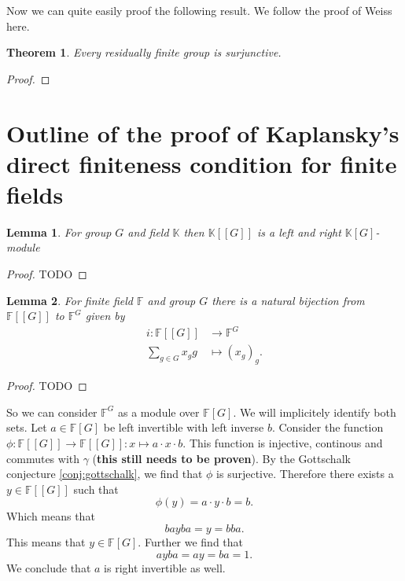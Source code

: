 \documentclass[titlepage, a4paper]{article}
\newcommand{\F}{\mathbb{F}}
\newtheorem{theorem}{Theorem}
\newtheorem{lemma}{Lemma}
\theoremstyle{remark}
\begin{document}
    Now we can quite easily proof the following result. We follow the proof of Weiss \cite{} here.
    \begin{theorem} \label{thm:res_fin_surjunctive}
    Every residually finite group is surjunctive.
    \end{theorem}
    \begin{proof}
    
    \end{proof}


	\section{Outline of the proof of Kaplansky's direct finiteness condition for finite fields}

	\begin{lemma}
		For group $G$ and field $\mathbb K$ then $\mathbb{K}[[G]]$ is a left and right $\mathbb{K}[G]$-module
	\end{lemma}
	\begin{proof}
		TODO
	\end{proof}
	\begin{lemma}
		For finite field $\F$ and group $G$ there is a natural bijection from $\F[[G]]$ to $\F^{G}$ given by \begin{align*}
			i: \F[[G]] &\longrightarrow \F^{G} \\
			\sum_{g \in G}^{ } x_{g}g &\longmapsto (x_g)_g
		.\end{align*}
	\end{lemma}
	\begin{proof}
		TODO
	\end{proof}
	So we can consider $\F^G$ as a module over $\F[G]$. We will implicitely identify both sets.
	Let $a\in \F[G]$ be left invertible with left inverse $b$. Consider the function $\phi: \F[[G]] \to \F[[G]]: x \mapsto a\cdot x \cdot b$. This function is injective, continous and commutes with $\gamma$ (\textbf{this still needs to be proven}).
	By the Gottschalk conjecture \ref{conj:gottschalk}, we find that $\phi$ is surjective. Therefore there exists a $y \in \F[[G]]$ such that \[
		\phi(y) = a \cdot y \cdot b = b
	.\] 
	Which means that  \[
	b a y b a = y =b b a
	.\] 
	This means that $y \in \F[G]$. Further we find that \[
		a y b a = a y  = b a = 1
.\] We conclude that $a$ is right invertible as well. 
	\printbibliography
\end{document}
